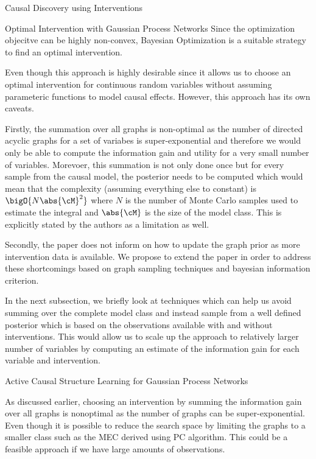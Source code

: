 \documentclass[10pt]{article}
\begin{document}
\begin{psection}[4]{Causal Discovery using Interventions}
\begin{psubsection}{Optimal Intervention with Gaussian Process Networks}
        Since the optimization objecitve can be highly non-convex, Bayesian Optimization
        is a suitable strategy to find an optimal intervention.

        Even though this approach is highly desirable since it allows us to choose
        an optimal intervention for continuous random variables without assuming
        parameteric functions to model causal effects. However, this approach has its
        own caveats.

        Firstly, the summation over all graphs is non-optimal as the number of directed
        acyclic graphs for a set of variabes is super-exponential and therefore we would
        only be able to compute the information gain and utility for a very small number
        of variables. Morevoer, this summation is not only done once but for every
        sample from the causal model, the posterior needs to be computed which would
        mean that the complexity (assuming everything else to constant) is
        $\bigO{N \abs{\cM}^2}$ where $N$ is the number of Monte Carlo samples used to
        estimate the integral and $\abs{\cM}$ is the size of the model class. This is
        explicitly stated by the authors as a limitation as well.

        Secondly, the paper does not inform on how to update the graph prior as more
        intervention data is available. We propose to extend the paper in order to
        address these shortcomings based on graph sampling techniques and bayesian
        information criterion.

        In the next subsection, we briefly look at techniques which can help us
        avoid summing over the complete model class and instead sample from a well
        defined posterior which is based on the observations available with and
        without interventions. This would allow us to scale up the approach to
        relatively larger number of variables by computing an estimate of the
        information gain for each variable and intervention.

    \end{psubsection}

    \begin{psubsection}{Active Causal Structure Learning for Gaussian Process Networks}
    
        As discussed earlier, choosing an intervention by summing the information gain
        over all graphs is nonoptimal as the number of graphs can be super-exponential.
        Even though it is possible to reduce the search space by limiting the graphs
        to a smaller class such as the MEC derived using PC algorithm. This could be 
        a feasible approach if we have large amounts of observations.


\end{psubsection}
\end{psection}
\end{document}
